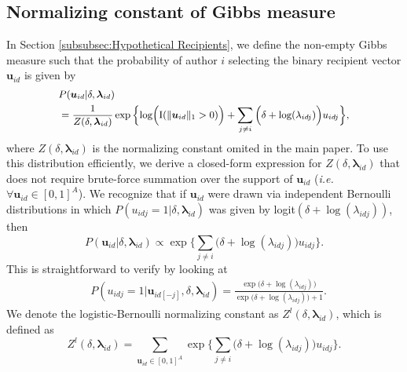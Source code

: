 \documentclass[twoside]{article}
\begin{document}
  	 \subsection{Normalizing constant of Gibbs measure}\label{subsec: non-empty Gibbs measure}
  	 In Section \ref{subsubsec:Hypothetical Recipients}, we define the non-empty Gibbs measure such that the probability of author $i$ selecting the binary recipient vector $\boldsymbol{u}_{id}$ is given by
  	 \begin{equation*} 
  	 \footnotesize
  	 \begin{aligned}
  	& P(\boldsymbol{u}_{id}| \delta, \boldsymbol{\lambda}_{id} ) \\&= \frac{1}{Z(\delta,\boldsymbol{\lambda}_{id})} \exp\Big\{ \mbox{log}\Big(\text{I}(\lVert \boldsymbol{u}_{id} \rVert_1 > 0)\Big) + \sum_{j \neq i} \Big(\delta+\mbox{log}(\lambda_{idj})\Big)u_{idj} \Big\},
  	 \end{aligned}
  	 \end{equation*}
  	 where $Z(\delta,\boldsymbol{\lambda}_{id})$ is the normalizing constant omited in the main paper.
  	 To use this distribution efficiently, we derive a closed-form expression for $Z(\delta,\boldsymbol{\lambda}_{id})$ that does not require brute-force summation over the support of $\boldsymbol{u}_{id}$ (\textit{i.e.} $\forall \boldsymbol{u}_{id} \in [0,1]^A$). We recognize that if $\boldsymbol{u}_{id}$ were drawn via independent Bernoulli distributions in which $P({u}_{idj}=1|\delta, \boldsymbol{\lambda}_{id})$ was given by logit$(\delta+\log(\lambda_{idj}))$, then \begin{equation*}
  	 P(\boldsymbol{u}_{id}|\delta, \boldsymbol{\lambda}_{id}) \propto \exp\Big\{\sum_{j \neq i } \Big(\delta+\log(\lambda_{idj})\Big)u_{idj}\Big\}.  	 
  	 \end{equation*}
  	 This is straightforward to verify by looking at 
  	 \begin{equation*}
  	 \begin{aligned}
  &P(u_{idj}=1|\boldsymbol{u}_{id[-j]}, \delta, \boldsymbol{\lambda}_{id})
  	 =\frac{ \exp{\Big(\delta+\log(\lambda_{idj})\Big)}}{\exp{\Big(\delta+\log(\lambda_{idj})\Big)} + 1}.\end{aligned}\end{equation*}
  	 We denote the logistic-Bernoulli normalizing constant as $Z^{l}(\delta,\boldsymbol{\lambda}_{id})$, which is defined as 
  	 \begin{equation*}
  	 Z^{l}(\delta,\boldsymbol{\lambda}_{id})=\sum_{\boldsymbol{u}_{id} \in [0,1]^{A}} \exp\Big\{\sum_{j\neq i} \Big(\delta+\log(\lambda_{idj})\Big)u_{idj}\Big\}.
  	 \end{equation*}
  	 
\end{document}
